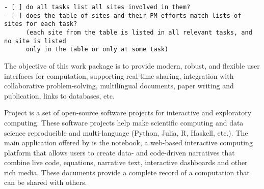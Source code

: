 \begin{draft}
\begin{verbatim}
- [ ] do all tasks list all sites involved in them?
- [ ] does the table of sites and their PM efforts match lists of sites for each task?
      (each site from the table is listed in all relevant tasks, and no site is listed
      only in the table or only at some task)
\end{verbatim}
\end{draft}

\begin{workpackage}[id=UI,wphases=0-48,swsites,
  title=User Interfaces,
  lead=SR,
  PSRM=26,  %
  UVRM=2,   %
  JURM=22,  %
  USHRM=6, %
  LLRM=4, %
  SARM=18, %
  UKRM=2, %
  UBRM=28,  %
  USORM=16, %
  SRRM=28,
  swsites]    %

\begin{wpobjectives}
  The objective of this work package is to provide modern, robust,
  and flexible user interfaces for computation, supporting real-time
  sharing, integration with collaborative problem-solving,
  multilingual documents, paper writing and publication, links to
  databases, etc.
\end{wpobjectives}

\begin{wpdescription}
  Project \Jupyter is a set of open-source software projects for interactive and exploratory
  computing. These software projects help make scientific computing and data science reproducible
  and multi-language (Python, Julia, R, Haskell, etc.). The main application offered by \Jupyter is
  the \Jupyter notebook, a web-based interactive computing platform that allows users to create
  data- and code-driven narratives that combine live code, equations, narrative text, interactive
  dashboards and other rich media. These documents provide a complete record of a computation that
  can be shared with others.


\end{wpdescription}
\end{workpackage}
